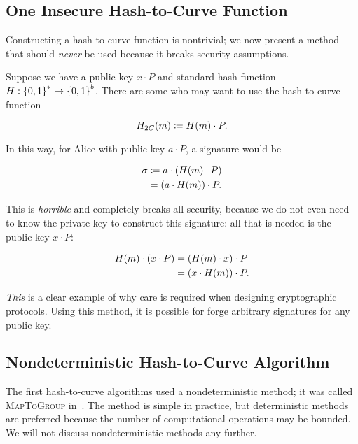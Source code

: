 \subsection{One Insecure Hash-to-Curve Function}

Constructing a hash-to-curve function is nontrivial;
we now present a method that should \emph{never} be used because
it breaks security assumptions.

Suppose we have a public key $x\cdot P$
and standard \gls{hash function} $H:\left\{ 0,1 \right\}^{*}\to\left\{ 0,1 \right\}^{b}$.
There are some who may want to use the hash-to-curve function

\begin{equation}
    H_{2C}(m) \coloneqq{} H(m)\cdot P.
\end{equation}

\noindent
In this way, for Alice with public key $a\cdot P$, a signature would be

\begin{align}
    \sigma &\coloneqq{} a\cdot\left( H(m)\cdot P \right) \nonumber\\
        &= \left( a\cdot H(m) \right)\cdot P.
\end{align}

\noindent
This is \emph{horrible} and completely breaks all security,
because we do not even need to know the private key to construct this signature:
all that is needed is the public key $x\cdot P$:

\begin{align}
    H(m)\cdot\left( x\cdot P \right) &= \left( H(m)\cdot x \right)\cdot P
            \nonumber\\
        &= \left( x\cdot H(m) \right)\cdot P.
\end{align}

\noindent
\emph{This} is a clear example of why care is required when designing
cryptographic protocols.
Using this method, it is possible for forge arbitrary signatures
for any public key.

\subsection{Nondeterministic Hash-to-Curve Algorithm}

The first hash-to-curve algorithms used a nondeterministic method;
it was called \textsc{MapToGroup} in~\cite{BLSSignatures}.
The method is simple in practice, but deterministic methods are preferred
because the number of computational operations may be bounded.
We will not discuss nondeterministic methods any further.

